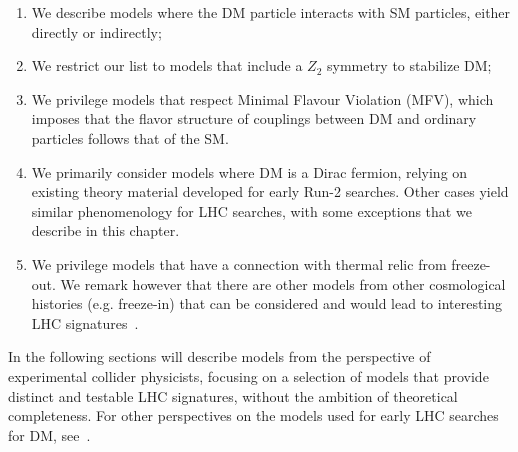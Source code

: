 \begin{enumerate}

\item We describe models where the DM particle interacts with SM particles, either directly or indirectly;
\item We restrict our list to models that include a $Z_2$ symmetry to stabilize DM;
\item We privilege models that respect Minimal Flavour Violation (MFV), which imposes that the flavor structure of couplings between DM and ordinary particles follows that of the SM.  %
\item We primarily consider models where DM is a Dirac fermion, relying on existing theory material developed for early Run-2 searches. Other cases yield similar phenomenology for LHC searches, with some exceptions that we describe in this chapter. 
\item We privilege models that have a connection with thermal relic from freeze-out. We remark however that there are other models from other cosmological histories (e.g. freeze-in) that can be considered and would lead to interesting LHC signatures~\cite{Bernal:2017kxu}. 
%
\end{enumerate}

In the following sections will describe models from the perspective of experimental collider physicists, focusing on a selection of models that provide distinct and testable LHC signatures, without the ambition of theoretical completeness. For other perspectives on the models used for early LHC searches for DM, see~\cite{Kahlhoefer:2017dnp,Abercrombie:2015wmb,Arcadi:2017kky,Ellis:2010kf}. %

